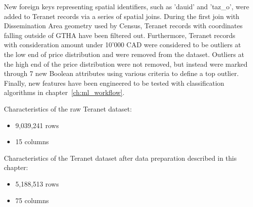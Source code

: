 New foreign keys representing spatial identifiers, such as 'dauid' and 'taz\_o', were added to Teranet records via a series of spatial joins.
During the first join with Dissemination Area geometry used by Census, Teranet records with coordinates falling outside of GTHA have been filtered out.
Furthermore, Teranet records with consideration amount under 10'000 CAD were considered to be outliers at the low end of price distribution and were removed from the dataset.
Outliers at the high end of the price distribution were not removed, but instead were marked through 7 new Boolean attributes using various criteria to define a top outlier.
Finally, new features have been engineered to be tested with classification algorithms in chapter~\ref{ch:ml_workflow}.

\vspace{5mm}

Characteristics of the raw Teranet dataset:
\begin{itemize}
    \item 9,039,241 rows
    \item 15 columns
\end{itemize}

Characteristics of the Teranet dataset after data preparation described in this chapter:
\begin{itemize}
    \item 5,188,513 rows
    \item 75 columns
\end{itemize}
